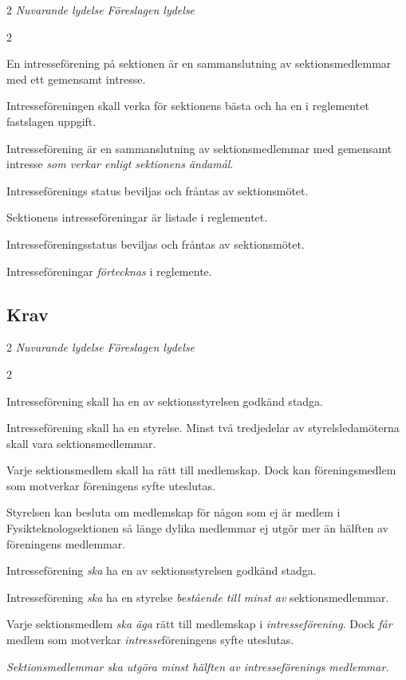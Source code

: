 \documentclass{article}
\newenvironment{lydelse}
    {\begin{paracol}{2}%
        \emph{Nuvarande lydelse}%
        \switchcolumn%
        \emph{Föreslagen lydelse}%
    \end{paracol}%
    \begin{enumerate}[label=\thesubsection.\arabic*]%
    \begin{paracol}{2}%
    }{\end{paracol}\end{enumerate}}
\begin{document}
\begin{lydelse}
  \setcounter{section}{12}
  \setcounter{subsection}{1}
  \item En intresseförening på sektionen är en sammanslutning av sektionsmedlemmar med ett gemensamt intresse.
  \item Intresseföreningen skall verka för sektionens bästa och ha en i reglementet fastslagen uppgift.
\switchcolumn
  \setcounter{section}{11}
  \item Intresseförening är en sammanslutning av sektionsmedlemmar med gemensamt intresse \emph{som verkar enligt sektionens ändamål}.
\switchcolumn*
  \setcounter{subsection}{3}
  \setcounter{enumi}{0}
  \item Intresseförenings status beviljas och fråntas av sektionsmötet.
  
  \setcounter{subsection}{8}
  \setcounter{enumi}{0}
  \item Sektionens intresseföreningar är listade i reglementet.
\switchcolumn
  \item Intresseföreningsstatus beviljas och fråntas av sektionsmötet.
  \item Intresseföreningar \emph{förtecknas} i reglemente.
\end{lydelse}
\setcounter{section}{11}
\setcounter{subsection}{0}

\subsection{Krav}
\begin{lydelse}
  \setcounter{section}{12}
  \setcounter{subsection}{2}
  \item Intresseförening skall ha en av sektionsstyrelsen godkänd stadga.
  \item Intresseförening skall ha en styrelse. Minst två tredjedelar av styrelsledamöterna skall vara sektionsmedlemmar.
  \setcounter{subsection}{7}
  \item Varje sektionsmedlem skall ha rätt till medlemskap. Dock kan föreningsmedlem som motverkar föreningens syfte uteslutas. 
  \item Styrelsen kan besluta om medlemskap för någon som ej är medlem i Fysikteknologsektionen så länge dylika medlemmar ej utgör mer än hälften av föreningens medlemmar.
  \switchcolumn
  \setcounter{section}{11}
  \item Intresseförening \emph{ska} ha en av sektionsstyrelsen godkänd stadga.
  \item Intresseförening \emph{ska} ha en styrelse \emph{bestående till minst  av} sektionsmedlemmar.
  \item Varje sektionsmedlem \emph{ska äga} rätt till medlemskap i \emph{intresseförening}.
    Dock \emph{får} medlem som motverkar \emph{intresse}föreningens syfte uteslutas. \label{11.x:intrrätt}
  \item \emph{Sektionsmedlemmar ska utgöra minst hälften av intresseförenings medlemmar.}
\end{lydelse}
\setcounter{section}{11}
\setcounter{subsection}{1}
\end{document}
